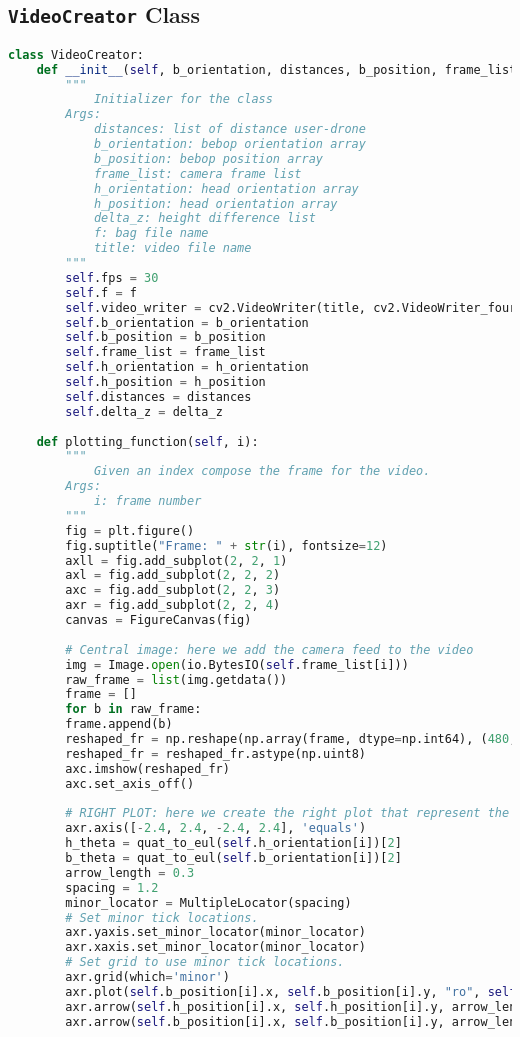 \subsection*{\texttt{VideoCreator} Class}
\begin{lstlisting}[caption={Video creator class},label={lst:videocreator},language=Python]
class VideoCreator:
	def __init__(self, b_orientation, distances, b_position, frame_list, h_orientation, h_position, delta_z, f, title="test.avi"):
		"""
			Initializer for the class
		Args:
			distances: list of distance user-drone
			b_orientation: bebop orientation array
			b_position: bebop position array
			frame_list: camera frame list
			h_orientation: head orientation array
			h_position: head orientation array
			delta_z: height difference list
			f: bag file name
			title: video file name
		"""
		self.fps = 30
		self.f = f
		self.video_writer = cv2.VideoWriter(title, cv2.VideoWriter_fourcc(*'XVID'), self.fps, (640, 480))
		self.b_orientation = b_orientation
		self.b_position = b_position
		self.frame_list = frame_list
		self.h_orientation = h_orientation
		self.h_position = h_position
		self.distances = distances
		self.delta_z = delta_z
	
	def plotting_function(self, i):
		"""
			Given an index compose the frame for the video.
		Args:
			i: frame number
		"""
		fig = plt.figure()
		fig.suptitle("Frame: " + str(i), fontsize=12)
		axll = fig.add_subplot(2, 2, 1)
		axl = fig.add_subplot(2, 2, 2)
		axc = fig.add_subplot(2, 2, 3)
		axr = fig.add_subplot(2, 2, 4)
		canvas = FigureCanvas(fig)
		
		# Central image: here we add the camera feed to the video
		img = Image.open(io.BytesIO(self.frame_list[i]))
		raw_frame = list(img.getdata())
		frame = []
		for b in raw_frame:
		frame.append(b)
		reshaped_fr = np.reshape(np.array(frame, dtype=np.int64), (480, 856, 3))
		reshaped_fr = reshaped_fr.astype(np.uint8)
		axc.imshow(reshaped_fr)
		axc.set_axis_off()
		
		# RIGHT PLOT: here we create the right plot that represent the position and heading of the bebop and head
		axr.axis([-2.4, 2.4, -2.4, 2.4], 'equals')
		h_theta = quat_to_eul(self.h_orientation[i])[2]
		b_theta = quat_to_eul(self.b_orientation[i])[2]
		arrow_length = 0.3
		spacing = 1.2
		minor_locator = MultipleLocator(spacing)
		# Set minor tick locations.
		axr.yaxis.set_minor_locator(minor_locator)
		axr.xaxis.set_minor_locator(minor_locator)
		# Set grid to use minor tick locations.
		axr.grid(which='minor')
		axr.plot(self.b_position[i].x, self.b_position[i].y, "ro", self.h_position[i].x, self.h_position[i].y, "go")
		axr.arrow(self.h_position[i].x, self.h_position[i].y, arrow_length * np.cos(h_theta), arrow_length * np.sin(h_theta), head_width=0.05, head_length=0.1, fc='g', ec='g')
		axr.arrow(self.b_position[i].x, self.b_position[i].y, arrow_length * np.cos(b_theta), arrow_length * np.sin(b_theta), head_width=0.05, head_length=0.1, fc='r', ec='r')
		

\end{lstlisting}
